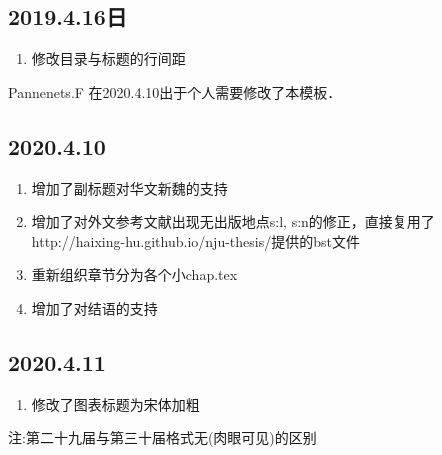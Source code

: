 \subsection{2019.4.16日}
\begin{enumerate}
    \item 修改目录与标题的行间距

\end{enumerate}

Pannenets.F 在2020.4.10出于个人需要修改了本模板．

\subsection{2020.4.10}
\begin{enumerate}
    \item 增加了副标题对华文新魏的支持
    \item 增加了对外文参考文献\cite{ghostnet}出现无出版地点s:l, s:n的修正，直接复用了http://haixing-hu.github.io/nju-thesis/提供的bst文件
    \item 重新组织章节分为各个小chap.tex
    \item 增加了对结语的支持
\end{enumerate}


\subsection{2020.4.11}
\begin{enumerate}
    \item 修改了图表标题为宋体加粗
\end{enumerate}


注:第二十九届与第三十届格式无(肉眼可见)的区别

